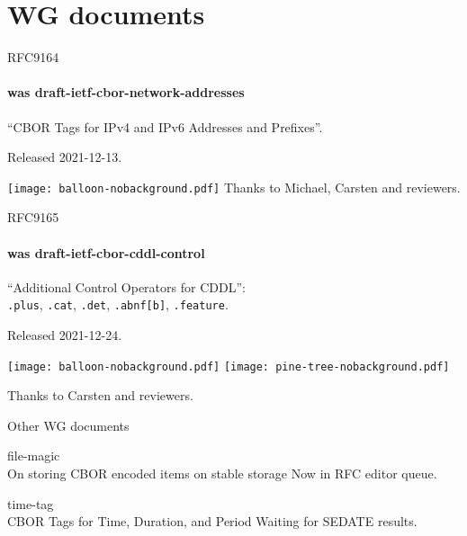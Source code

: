 \documentclass[aspectratio=169]{beamer}
\begin{document}
\section*{WG documents}

\begin{frame}{RFC9164}\Large
        \framesubtitle{was draft-ietf-cbor-network-addresses}

        ``CBOR Tags for IPv4 and IPv6 Addresses and Prefixes''.

        \bigskip

        Released 2021-12-13.

        \begin{block}{\texttt{[image: balloon-nobackground.pdf]}\mbox{\quad}}
                Thanks to Michael, Carsten and reviewers.
        \end{block}
\end{frame}

\begin{frame}{RFC9165}\Large
        \framesubtitle{was draft-ietf-cbor-cddl-control}

        ``Additional Control Operators for CDDL'':\\
        \texttt{.plus}, \texttt{.cat}, \texttt{.det}, \texttt{.abnf[b]}, \texttt{.feature}.

        \bigskip

        Released 2021-12-24.

        \vspace{-1.5cm}

        \begin{block}{
                \texttt{[image: balloon-nobackground.pdf]}\mbox{\quad}
                \texttt{[image: pine-tree-nobackground.pdf]}}

                \vspace{2cm}
                Thanks to Carsten and reviewers.
        \end{block}
\end{frame}

\begin{frame}{Other WG documents}\Large

    \begin{block}{\Large file-magic \\ \small On storing CBOR encoded items on stable storage}
        Now in RFC editor queue.
    \end{block}

    \bigskip

    \begin{block}{\Large time-tag \\ \small CBOR Tags for Time, Duration, and Period}
        Waiting for SEDATE results.
    \end{block}

\end{frame}
\end{document}
